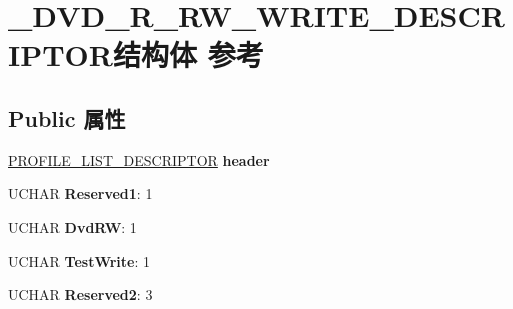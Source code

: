 \hypertarget{struct___d_v_d___r___r_w___w_r_i_t_e___d_e_s_c_r_i_p_t_o_r}{}\section{\+\_\+\+D\+V\+D\+\_\+\+R\+\_\+\+R\+W\+\_\+\+W\+R\+I\+T\+E\+\_\+\+D\+E\+S\+C\+R\+I\+P\+T\+O\+R结构体 参考}
\label{struct___d_v_d___r___r_w___w_r_i_t_e___d_e_s_c_r_i_p_t_o_r}
\subsection*{Public 属性}
\begin{DoxyCompactItemize}
\item 
\mbox{\label{struct___d_v_d___r___r_w___w_r_i_t_e___d_e_s_c_r_i_p_t_o_r_a381c056ff09b5fce1147a8a1fab54fcb}} 
\hyperlink{struct___p_r_o_f_i_l_e___l_i_s_t___d_e_s_c_r_i_p_t_o_r}{P\+R\+O\+F\+I\+L\+E\+\_\+\+L\+I\+S\+T\+\_\+\+D\+E\+S\+C\+R\+I\+P\+T\+OR} {\bfseries header}
\item 
\mbox{\label{struct___d_v_d___r___r_w___w_r_i_t_e___d_e_s_c_r_i_p_t_o_r_a77b1079d2a217b3d2de7014ab3dc5066}} 
U\+C\+H\+AR {\bfseries Reserved1}\+: 1
\item 
\mbox{\label{struct___d_v_d___r___r_w___w_r_i_t_e___d_e_s_c_r_i_p_t_o_r_a677a2be5b4b4bea549f9ccf0668e8183}} 
U\+C\+H\+AR {\bfseries Dvd\+RW}\+: 1
\item 
\mbox{\label{struct___d_v_d___r___r_w___w_r_i_t_e___d_e_s_c_r_i_p_t_o_r_a3d3794682d927484d71bf23548ab598b}} 
U\+C\+H\+AR {\bfseries Test\+Write}\+: 1
\item 
\mbox{\label{struct___d_v_d___r___r_w___w_r_i_t_e___d_e_s_c_r_i_p_t_o_r_a5b3f5b042a95b2f7c5e48563d0dc7444}} 
U\+C\+H\+AR {\bfseries Reserved2}\+: 3
\item 
\mbox{\label{struct___d_v_d___r___r_w___w_r_i_t_e___d_e_s_c_r_i_p_t_o_r_abc8ac7eacd0344e5754c964f208e4a44}} 

\end{DoxyCompactItemize}
